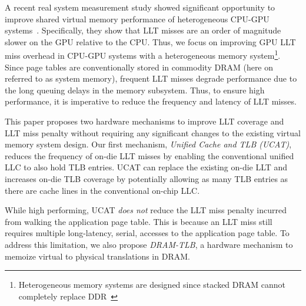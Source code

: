 
A recent real system measurement study showed significant opportunity
to improve shared virtual memory performance of heterogeneous CPU-GPU
systems~\cite{vesley2016ispass}. Specifically, they show that LLT
misses are an order of magnitude slower on the GPU relative to the
CPU. Thus, we focus on improving GPU LLT miss overhead in CPU-GPU
systems with a heterogeneous memory system\footnote{Heterogeneous
memory systems are designed since stacked DRAM cannot completely
replace DDR~\cite{BEAR,moin2012}}. Since page tables are
conventionally stored in commodity DRAM (here on referred to as system
memory), frequent LLT misses degrade performance due to the long queuing delays
in the memory subsystem. Thus, to ensure high performance, it is imperative to reduce the frequency and latency of LLT misses.



This paper proposes two hardware mechanisms to improve LLT coverage and LLT miss penalty without requiring any significant changes to the existing virtual memory system design. Our first mechanism, {\em Unified Cache and TLB (UCAT)}, reduces the frequency of on-die LLT misses by enabling the conventional unified LLC to also hold TLB entries. UCAT can replace the existing on-die LLT and increases on-die TLB coverage by potentially allowing as many TLB entries as there are cache lines in the conventional on-chip LLC.


While high performing, UCAT {\em does not} reduce the LLT miss penalty incurred from walking the application page table. This is because an LLT miss still requires multiple long-latency, serial, accesses to the application page table. To address this limitation, we also propose {\em DRAM-TLB}, a hardware mechanism to memoize virtual to physical translations in DRAM.

